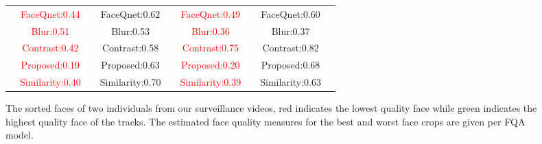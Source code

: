 \documentclass[runningheads]{llncs}
\begin{document}
\begin{figure*}[t]
\begin{tabularx}{\textwidth}{@{}c*{8}{C}@{}}
   & \textcolor{red}{FaceQnet:0.44} & & \textcolor{mygreen}{FaceQnet:0.62} & & \textcolor{red}{FaceQnet:0.49} & &\textcolor{mygreen}{FaceQnet:0.60} & \\
   &\textcolor{red}{Blur:0.51} & & \textcolor{mygreen}{Blur:0.53} & & \textcolor{red}{Blur:0.36} & &  \textcolor{mygreen}{Blur:0.37} &
   \\
   & \textcolor{red}{Contrast:0.42} & & \textcolor{mygreen}{Contrast:0.58} & & \textcolor{red}{Contrast:0.75} & & \textcolor{mygreen}{Contrast:0.82} &
   \\
   & \textcolor{red}{Proposed:0.19} & & \textcolor{mygreen}{Proposed:0.63} & & \textcolor{red}{Proposed:0.20} & & \textcolor{mygreen}{Proposed:0.68} &
   \\
   & \textcolor{red}{Similarity:0.40} & & 
   \textcolor{mygreen}{Similarity:0.70} & & 
   \textcolor{red}{Similarity:0.39} & & 
   \textcolor{mygreen}{Similarity:0.63} &
   \\
\end{tabularx}
\caption{The sorted faces of two individuals from our surveillance videos, red indicates the lowest quality face while green indicates the highest quality face of the tracks. The estimated face quality measures for the best and worst face crops are given per FQA model. } \label{fig:tf}
\end{figure*}
\end{document}
